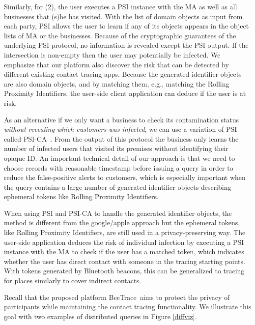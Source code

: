 \documentclass[11pt]{article}  %
\newcommand{\sysname}{\textsf{BeeTrace}\xspace}
\begin{document}
Similarly, for (2), the user executes a PSI instance with the MA as well as all businesses that (s)he has visited. With the list of domain objects as input from each party, PSI allows the user to learn if any of its objects appears in the object lists of MA or the businesses. Because of the cryptographic guarantees of the underlying PSI protocol, no information is revealed except the PSI output. 
If the intersection is non-empty then the user may potentially be infected. We emphasize that our platform also discover the risk that can be detected by different existing contact tracing apps. Because the generated identifier objects are also domain objects, and by matching them, e.g., matching the Rolling Proximity Identifiers, the user-side client application can deduce if the user is at risk.


As an alternative if we only want a business to check its contamination status \emph{without revealing which customers was infected}, we can use a variation of PSI called PSI-CA~\cite{Ni2020}. 
From the output of this protocol the business only learns the number of infected users that visited its premises without identifying their opaque ID. 
An important technical detail of our approach is that we need to choose records with reasonable timestamp before issuing a query in order to reduce the false-positive alerts to customers, which is especially important when the query contains a large number of generated identifier objects describing ephemeral tokens like Rolling Proximity Identifiers.



When using PSI and PSI-CA to handle the generated identifier objects, the method is different from the google/apple approach but the ephemeral tokens, like Rolling Proximity Identifiers, are still used in a privacy-preserving way. The user-side application deduces the risk of individual infection by executing a PSI instance with the MA to check if the user has a matched token, which indicates whether the user has direct contact with someone in the tracing starting points. With tokens generated by Bluetooth beacons, this can be generalized to tracing for places similarly to cover indirect contacts.

Recall that the proposed platform \sysname\ aims to protect the privacy of participants while maintaining the contact tracing functionality. 
We illustrate this goal with two examples of distributed queries in Figure \ref{diffviz}.
\end{document}
